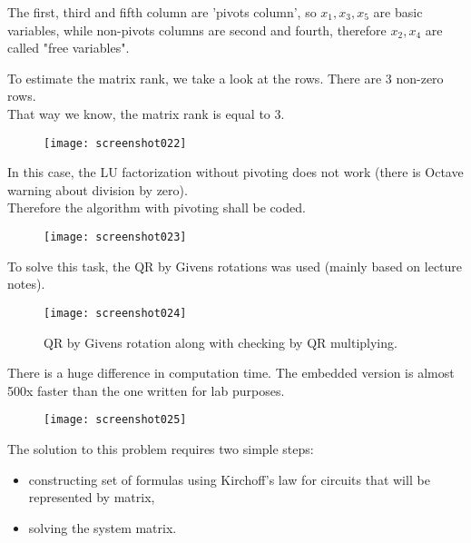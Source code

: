 \documentclass[eng,openany]{mgr}
\begin{document}
The first, third and fifth column are 'pivots column', so 
\begin{math}
x_{1}, x_{3}, x_{5} 
\end{math}
are basic variables, while non-pivots columns are second and fourth, therefore
\begin{math}
x_{2}, x_{4} 
\end{math}
are called "free variables".

To estimate the matrix rank, we take a look at the rows. There are 3 non-zero rows. \\
That way we know, the matrix rank is equal to 3.
\newpage
\begin{figure}[h]
\centering
\texttt{[image: screenshot022]}
\label{fig:screenshot022}
\end{figure}
In this case, the LU factorization without pivoting does not work (there is Octave warning about division by zero).\\
Therefore the algorithm with pivoting shall be coded.

\newpage
\begin{figure}[h]
\centering
\texttt{[image: screenshot023]}
\label{fig:screenshot023}
\end{figure}

To solve this task, the QR by Givens rotations was used (mainly based on lecture notes).

\begin{figure}[h]
\centering
\texttt{[image: screenshot024]}
\caption{QR by Givens rotation along with checking by QR multiplying.}
\label{fig:screenshot024}
\end{figure}

There is a huge difference in computation time. The embedded version is almost 500x faster than the one written for lab purposes.

\newpage
\begin{figure}[h]
\centering
\texttt{[image: screenshot025]}
\label{fig:screenshot025}
\end{figure}

The solution to this problem requires two simple steps:
\begin{itemize}
	\item constructing set of formulas using Kirchoff's law for circuits that will be represented by matrix,
	\item solving the system matrix.
\end{itemize}
\end{document}

